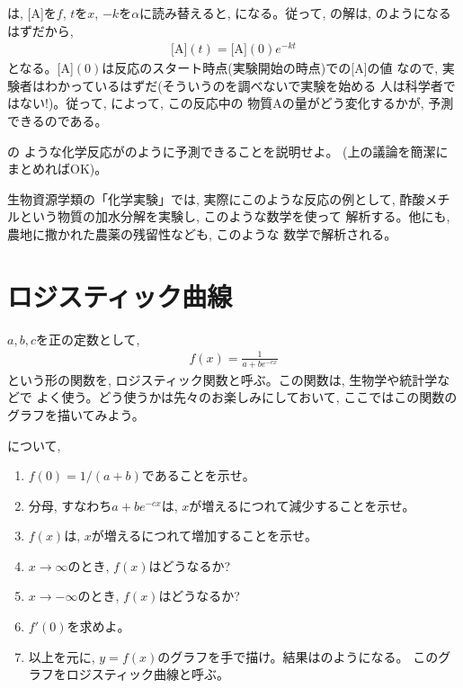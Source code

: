は, [A]を$f$, $t$を$x$, $-k$を$\alpha$に読み替えると, 
になる。従って, の解は, のようになるはずだから, 
\begin{eqnarray}
\mbox{[A]}(t)=\mbox{[A]}(0)e^{-kt}\label{eq:chem_react7}
\end{eqnarray}
となる。[A]$(0)$は反応のスタート時点(実験開始の時点)での[A]の値
なので, 実験者はわかっているはずだ(そういうのを調べないで実験を始める
人は科学者ではない!)。従って, によって, この反応中の
物質Aの量がどう変化するかが, 予測できるのである。\\

\begin{q}\label{q:diffeq_1_chem_react} の
ような化学反応がのように予測できることを説明せよ。
(上の議論を簡潔にまとめればOK)。\end{q}

生物資源学類の「化学実験」では, 実際にこのような反応の例として, 
酢酸メチルという物質の加水分解を実験し, このような数学を使って
解析する。他にも, 農地に撒かれた農薬の残留性なども, このような
数学で解析される。\\



\section{ロジスティック曲線}\label{sect:logistic_curve}

$a, b, c$を正の定数として, 
\begin{eqnarray}
f(x)=\frac{1}{a+be^{-cx}}\label{eq:logistic_func0}
\end{eqnarray}
という形の関数を, ロジスティック関数と呼ぶ。この関数は, 生物学や統計学などで
よく使う。どう使うかは先々のお楽しみにしておいて, ここではこの関数のグラフを描いてみよう。

\begin{q}\label{q:logistic_func}について, 
\begin{enumerate}
\item $f(0)=1/(a+b)$であることを示せ。
\item 分母, すなわち$a+be^{-cx}$は, $x$が増えるにつれて減少することを示せ。
\item $f(x)$は, $x$が増えるにつれて増加することを示せ。
\item $x\rightarrow\infty$のとき, $f(x)$はどうなるか?
\item $x\rightarrow-\infty$のとき, $f(x)$はどうなるか?
\item $f'(0)$を求めよ。
\item 以上を元に, $y=f(x)$のグラフを手で描け。結果はのようになる。
このグラフをロジスティック曲線と呼ぶ。
\end{enumerate}
\end{q}

